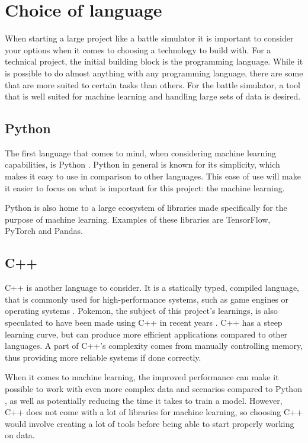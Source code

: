 \section{Choice of language}
\label{sec:choice-of-language}

When starting a large project like a battle simulator it is important to consider your options when it comes to choosing a technology to build with.
For a technical project, the initial building block is the programming language. While it is possible to do almost anything with any 
programming language, there are some that are more suited to certain tasks than others. For the battle simulator, a tool that is well 
suited for machine learning and handling large sets of data is desired.

\subsection{Python}
The first language that comes to mind, when considering machine learning capabilities, is Python \cite{PythonForMachineLearning}.
Python in general is known for its simplicity, which makes it easy to use in comparison to other languages. This ease of use will make it
easier to focus on what is important for this project: the machine learning.

Python is also home to a large ecosystem of libraries made specifically for the purpose of machine learning. Examples of these libraries are
TensorFlow, PyTorch and Pandas.


\subsection{C++}
C++ is another language to consider. It is a statically typed, compiled language, that is commonly used for high-performance systems, such as
game engines or operating systems \cite{C++}. Pokemon, the subject of this project's learnings, is also speculated to have been made using C++ in recent years \cite{PokemonProgrammingLanguageForumPost}\cite{NintendoDataLeak}\cite{ChatGPTPokemonProgrammingLanguage}.
C++ has a steep learning curve, but can produce more efficient applications compared to other languages. 
A part of C++'s complexity comes from manually controlling memory, thus providing more reliable systems if done correctly. 

When it comes to machine learning, the improved performance can make it possible to work with even more complex data and scenarios compared 
to Python \cite{C++VsPythonML}, as well as potentially reducing the time it takes to train a model. However, C++ does not come with a lot of libraries
for machine learning, so choosing C++ would involve creating a lot of tools before being able to start properly working on data.

